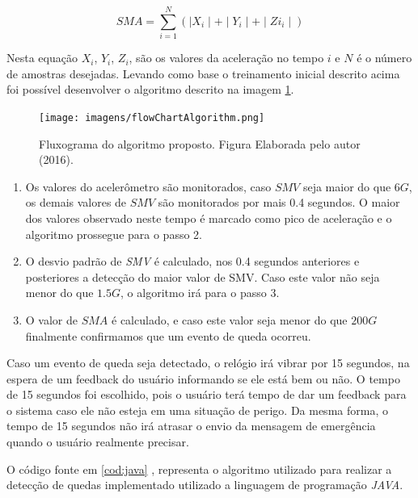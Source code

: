 \begin{equation}
SMA = \sum_{i=1}^{N} (\mid X_i\mid + \mid Y_i \mid + \mid Zi_i \mid)
\label{eq:SMA}
\end{equation}

Nesta equação $X_i$, $Y_i$, $Z_i$, são os valores da aceleração no tempo $i$ e $N$ é o número de amostras desejadas. Levando como base o treinamento inicial descrito acima foi possível desenvolver o algoritmo descrito na imagem \ref{fig:flow_chart}.

\begin{figure}[ht]
	\centering
	\texttt{[image: imagens/flowChartAlgorithm.png]}
	\caption{ Fluxograma do algoritmo proposto. Figura Elaborada pelo autor (2016).}
	\label{fig:flow_chart}
\end{figure} 

	\begin{enumerate}
		\item Os valores do acelerômetro são monitorados, caso $SMV$ seja maior do que $6G$, os demais valores de $SMV$ são monitorados por mais 0.4 segundos. O maior dos valores observado neste tempo é marcado como pico de aceleração e o algoritmo prossegue para o passo 2.
		\item O desvio padrão de \textit{SMV} é calculado, nos 0.4 segundos anteriores e posteriores a detecção do maior valor de SMV. Caso este valor não seja menor do que $1.5G$,  o algoritmo irá para o passo 3.
		\item O valor de $SMA$ é calculado, e caso este valor seja menor do que $ 200G $ finalmente confirmamos que um evento de queda ocorreu.
	\end{enumerate}

 Caso um evento de queda seja detectado, o relógio irá vibrar por 15 segundos, na espera de um feedback do usuário informando se ele está bem ou não. O tempo de 15 segundos foi escolhido, pois o usuário terá tempo de dar um feedback para o sistema caso ele não esteja em uma situação de perigo. Da mesma forma, o tempo de 15 segundos não irá atrasar o envio da mensagem de emergência quando o usuário realmente precisar.  
 
 O código fonte em \ref{cod:java} , representa o algoritmo utilizado para realizar a detecção de quedas implementado utilizado a linguagem de programação \textit{JAVA}. 
 
